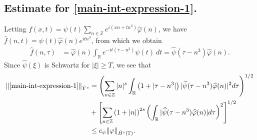 \documentclass[12pt,reqno]{amsart}
\numberwithin{equation}{section}  %
\numberwithin{figure}{section}
\newcommand{\rr}{\mathbb{R}}
\newcommand{\zz}{\mathbb{Z}}
\newcommand{\ci}{\mathbb{T}}
\newcommand{\wh}{\widehat}
\newcommand{\vp}{\varphi}
\theoremstyle{plain}
\theoremstyle{definition}
\theoremstyle{remark}
\begin{document}
\subsection{Estimate for \eqref{main-int-expression-1}.}
%
%
Letting $f(x,t) = \psi(t) \sum_{n \in \zz} e^{i(xn + tn^{3})} 
\wh{\vp}(n)$, we have $\wh{f}(n,t) = \psi(t) \wh{\vp}(n) e^{itn^{3}}$,
from which we obtain
%
%
\begin{equation}
	\label{fourier-trans-calc}
	\begin{split}
		\wh{f}(n, \tau)
		& = \wh{\vp}(n) \int_\rr e^{-it( \tau - n^{3})} 
		\psi(t) \ d t
		= \wh{\psi}(\tau - n^{3}) \wh{\vp}(n).
	\end{split}
\end{equation}
%
%
%
%
%
%
Since $\wh{\psi}(\xi)$ is Schwartz for $|\xi| \ge T$, we see that 
%
%
\begin{equation}
	\begin{split}
	\label{main-int1-est}
		\|\eqref{main-int-expression-1}\|_{\dot{Y}^s}
		& = \left (  \sum_{n\in \zz} |n|^s \int_\rr \left( 1 + | \tau - n^{3} 
		| \right )
		| \wh{\psi}(\tau - n^{3}) \wh{\vp}(n) |^2 d \tau \right)^{1/2} 
		\\
		& + \left[ \sum_{n \in \zz }\left( 1 + | n | \right)^{2s} \left( \int_{\rr} |
		\wh{\psi}(\tau - n^{3})\wh{\vp}(n) | d \tau
		\right)^{2} \right]^{1/2}
		\\
		& \le c_{\psi}
		\|\vp\|_{\dot{H}^s(\ci)}.
	\end{split}
\end{equation}
%
%
%
%
\end{document}
